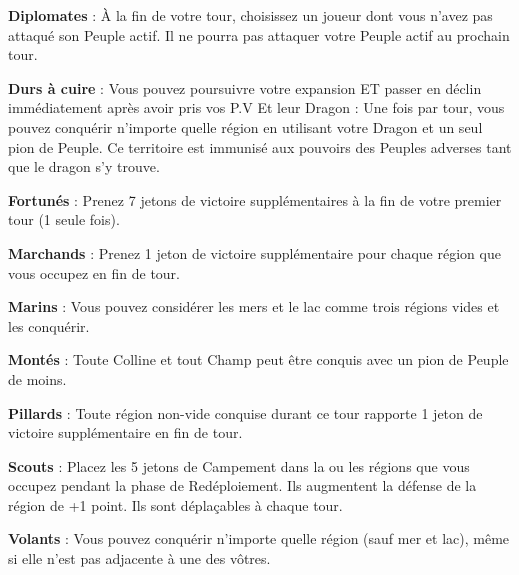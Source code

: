 \documentclass{scrartcl}%
\begin{document}
\begin{description}
%
\textcolor{mygreen}{%
\textbf{Diplomates}%
}%
\textit{ }%
 : À la fin de votre tour, choisissez un joueur dont vous n'avez pas attaqué son Peuple actif. Il ne pourra pas attaquer votre Peuple actif au prochain tour.
%
\item[{-} ]%
%
\textcolor{mygreen}{%
\textbf{Durs à cuire}%
}%
\textit{ }%
 : Vous pouvez poursuivre votre expansion ET passer en déclin immédiatement après avoir pris vos P.V Et leur Dragon : Une fois par tour, vous pouvez conquérir n'importe quelle région en utilisant votre Dragon et un seul pion de Peuple. Ce territoire est immunisé aux pouvoirs des Peuples adverses tant que le dragon s'y trouve.
%
\item[{-} ]%
%
\textcolor{mygreen}{%
\textbf{Fortunés}%
}%
\textit{ }%
 : Prenez 7 jetons de victoire supplémentaires à la fin de votre premier tour (1 seule fois). 
%
\item[{-} ]%
%
\textcolor{mygreen}{%
\textbf{Marchands}%
}%
: Prenez 1 jeton de victoire supplémentaire pour chaque région que vous occupez en fin de tour.
%
\item[{-} ]%
%
\textcolor{mygreen}{%
\textbf{Marins}%
}%
\textit{ }%
 : Vous pouvez considérer les mers et le lac comme trois régions vides et les conquérir.
%
\item[{-} ]%
%
\textcolor{mygreen}{%
\textbf{Montés}%
}%
\textit{ }%
 : Toute Colline et tout Champ peut être conquis avec un pion de Peuple de moins.
%
\item[{-} ]%
%
\textcolor{mygreen}{%
\textbf{Pillards}%
}%
\textit{ }%
 : Toute région non{-}vide conquise durant ce tour rapporte 1 jeton de victoire supplémentaire en fin de tour.
%
\item[{-} ]%
%
\textcolor{mygreen}{%
\textbf{Scouts}%
}%
\textit{ }%
 : Placez les 5 jetons de Campement dans la ou les régions que vous occupez pendant la phase de Redéploiement. Ils augmentent la défense de la région de +1 point. Ils sont déplaçables à chaque tour.
%
\item[{-} ]%
%
\textcolor{mygreen}{%
\textbf{Volants}%
}%
\textit{ }%
 : Vous pouvez conquérir n'importe quelle région (sauf mer et lac), même si elle n'est pas adjacente à une des vôtres.
%
\end{description}

%
\sectionfont{\color{red}}%
\subsectionfont{\color{red}}%
\subsubsectionfont{\color{red}}%
\end{document}
